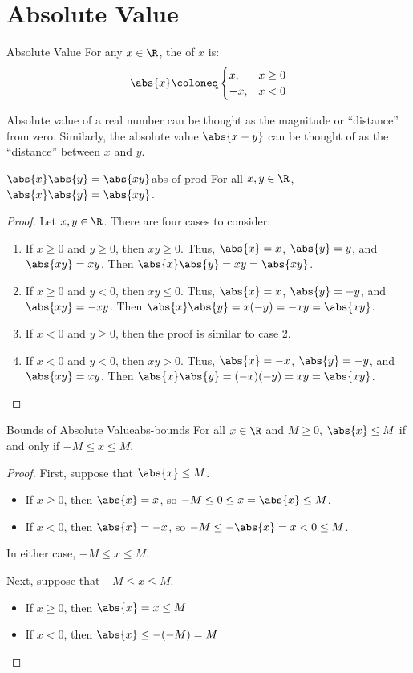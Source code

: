 \documentclass[letterpaper,12pt]{report}
\begin{document}
\section{Absolute Value}
\begin{dfnbox}{Absolute Value}{}
	For any $x \in \R$, the  of $x$ is:
	$$\abs{x} \coloneq \begin{cases}
		x, & x \geq 0 \\
		-x, & x < 0
	\end{cases}$$
\end{dfnbox}

Absolute value of a real number can be thought as the magnitude or ``distance'' from zero. Similarly, the absolute value $\abs{x-y}$ can be thought of as the ``distance'' between $x$ and $y$.

\begin{exbox}{$\abs{x}\abs{y} = \abs{xy}$}{abs-of-prod}
	For all $x, y \in \R$, $\abs{x}\abs{y} = \abs{xy}$.
	\tcblower
	\begin{proof}
		Let $x,y \in \R$. There are four cases to consider:
		\begin{enumerate}
			\item If $x \geq 0$ and $y \geq 0$, then $xy \geq 0$. Thus, $\abs{x} = x$, $\abs{y} = y$, and $\abs{xy} = xy$. Then $\abs{x}\abs{y} = xy = \abs{xy}$.
			\item If $x \geq 0$ and $y < 0$, then $xy \leq 0$. Thus, $\abs{x} = x$, $\abs{y} = -y$, and $\abs{xy} = -xy$. Then $\abs{x}\abs{y} = x(-y) = -xy = \abs{xy}$.
			\item If $x<0$ and $y \geq 0$, then the proof is similar to case 2.
			\item If $x<0$ and $y<0$, then $xy>0$. Thus, $\abs{x} = -x$, $\abs{y} = -y$, and $\abs{xy} = xy$. Then $\abs{x}\abs{y} = (-x)(-y) = xy = \abs{xy}$.
		\end{enumerate}
	\end{proof}
\end{exbox}

\begin{exbox}{Bounds of Absolute Value}{abs-bounds}
	For all $x \in \R$ and $M \geq 0$, $\abs{x} \leq M$ if and only if $-M \leq x \leq M$.
	\tcblower
	\begin{proof}
		First, suppose that $\abs{x} \leq M$.
		\begin{itemize}
			\item If $x \geq 0$, then $\abs{x} = x$, so $-M \leq 0 \leq x = \abs{x} \leq M$.
			\item If $x < 0$, then $\abs{x} = -x$, so $-M \leq - \abs{x} = x < 0 \leq M$.
		\end{itemize}
		In either case, $-M \leq x \leq M$.

		Next, suppose that $-M \leq x \leq M$.
		\begin{itemize}
			\item If $x \geq 0$, then $\abs{x} = x \leq M$
			\item If $x < 0$, then $\abs{x} \leq -(-M) = M$
		\end{itemize}
	\end{proof}
\end{exbox}
\end{document}
